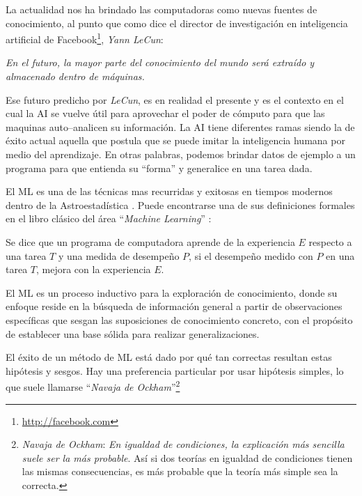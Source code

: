 La actualidad nos ha brindado las computadoras como nuevas fuentes de conocimiento, al punto que como dice el director de investigación en inteligencia artificial de Facebook\footnote{\url{http://facebook.com}}, \textit{Yann LeCun}:

\begin{displayquote}
\textit{En el futuro, la mayor parte del conocimiento del mundo será extraído y almacenado dentro de máquinas.}
\end{displayquote}

Ese futuro predicho por \textit{LeCun}, es en realidad el presente y es el contexto en el cual la \gls{AI} se vuelve útil para aprovechar el poder de cómputo para que las maquinas auto--analicen su información. La \gls{AI} tiene diferentes ramas siendo la de éxito actual aquella que postula que se puede imitar la inteligencia humana por medio del aprendizaje. En otras palabras, podemos brindar datos de ejemplo a un programa para que entienda su ``forma'' y generalice en una tarea dada.

El \gls{ML} es una de las técnicas mas recurridas y exitosas en tiempos modernos dentro de la Astroestadística \citep{fluke2020surveying}. Puede encontrarse una de sus definiciones formales en el libro clásico del área ``\textit{Machine Learning}'' \citep{mitchell1997machine}:

\begin{displayquote}
Se dice que un programa de computadora aprende de la experiencia $E$
respecto a una tarea $T$ y una medida de desempeño $P$, si el desempeño medido con $P$ en una tarea $T$, mejora con la experiencia $E$.
\end{displayquote}

El \gls{ML} es un proceso inductivo para la exploración de conocimiento, donde su enfoque reside en la búsqueda de información general a partir de observaciones específicas que sesgan las suposiciones de conocimiento concreto, con el propósito de establecer una base sólida para realizar generalizaciones. 

El éxito de un método de \gls{ML} está dado por qué tan correctas resultan estas hipótesis y sesgos. Hay una preferencia particular por usar hipótesis simples, lo que suele llamarse ``\textit{Navaja de Ockham}''\footnote{\textit{Navaja de Ockham}: \textit{En igualdad de condiciones, la explicación más sencilla suele ser la más probable}. Así si dos teorías en igualdad de condiciones tienen las mismas consecuencias, es más probable que la teoría más simple sea la correcta.}

